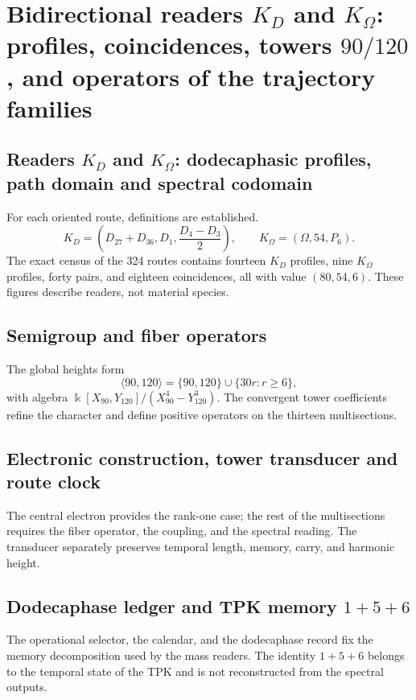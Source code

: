 \chapter{Bidirectional readers \texorpdfstring{\(K_D\)}{K(D)} and \texorpdfstring{\(K_\Omega\)}{K(Omega)}: profiles, coincidences, towers \texorpdfstring{\(90/120\)}{90/120}, and operators of the trajectory families}
\label{chap:lectores-bidireccionales-torres-operadores}

\section{Readers \(K_D\) and \(K_\Omega\): dodecaphasic profiles, path domain and spectral codomain}
For each oriented route, definitions are established.
\[
 K_D=\left(D_{27}+D_{36},D_1,\frac{D_4-D_3}{2}\right),
 \qquad K_\Omega=(\Omega,54,P_6).
\]
The exact census of the 324 routes contains fourteen \(K_D\) profiles, nine
\(K_\Omega\) profiles, forty pairs, and eighteen coincidences, all with
value \((80,54,6)\). These figures describe readers, not material species.

\section{Semigroup and fiber operators}
The global heights form
\[
 \langle90,120\rangle=\{90,120\}\cup\{30r:r\ge6\},
\]
with algebra \(\Bbbk[X_{90},Y_{120}]/(X_{90}^4-Y_{120}^3)\). The convergent
tower coefficients refine the character and define positive operators on
the thirteen multisections.

\section{Electronic construction, tower transducer and route clock}
The central electron provides the rank-one case; the rest of the
multisections requires the fiber operator, the coupling, and the spectral
reading. The transducer separately preserves temporal length, memory,
carry, and harmonic height.

\section{Dodecaphase ledger and TPK memory \texorpdfstring{\(1+5+6\)}{1+5+6}}

The operational selector, the calendar, and the dodecaphase record fix the
memory decomposition used by the mass readers. The identity
\(1+5+6\) belongs to the temporal state of the TPK and is not reconstructed from the
spectral outputs.

